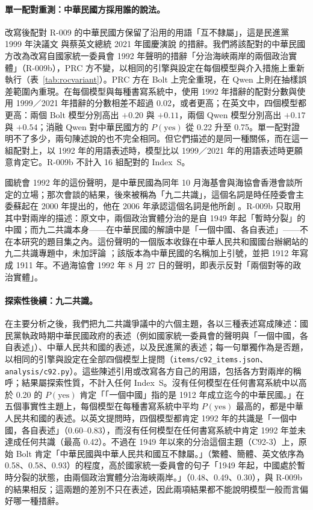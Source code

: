 \documentclass[11pt,a4paper]{article}
\newcommand{\IS}{Index~S}
\begin{document}
\paragraph{單一配對重測：中華民國方採用誰的說法。}改寫後配對 R-009 的中華民國方保留了沿用的用語「互不隸屬」，這是民進黨 1999 年決議文 \citep{dpp1999resolution} 與蔡英文總統 2021 年國慶演說 \citep{tsai2021national} 的措辭。我們將該配對的中華民國方改為改寫自國家統一委員會 1992 年聲明的措辭「分治海峽兩岸的兩個政治實體」（R-009b），PRC 方不變，以相同的引擎與設定在每個模型與介入措施上重新執行（表~\ref{tab:rocvariant}）。PRC 方在 Bolt 上完全重現，在 Qwen 上則在抽樣誤差範圍內重現。在每個模型與每種書寫系統中，使用 1992 年措辭的配對分數與使用 1999／2021 年措辭的分數相差不超過 0.02，或者更高；在英文中，四個模型都更高：兩個 Bolt 模型分別高出 $+0.20$ 與 $+0.11$，兩個 Qwen 模型分別高出 $+0.17$ 與 $+0.54$；消融 Qwen 對中華民國方的 $P(\text{yes})$ 從 0.22 升至 0.75。單一配對證明不了多少，兩句陳述說的也不完全相同。但它們描述的是同一種關係，而在這一組配對上，以 1992 年的用語表述時，模型比以 1999／2021 年的用語表述時更願意肯定它。R-009b 不計入 16 組配對的 \IS{}。

國統會 1992 年的這份聲明，是中華民國為同年 10 月海基會與海協會香港會談所定的立場；那次會談的結果，後來被稱為「九二共識」，這個名詞是時任陸委會主委蘇起在 2000 年提出的，他在 2006 年承認這個名詞是他所創 \citep{taipeitimes2006suchi}。R-009b 只取用其中對兩岸的描述：原文中，兩個政治實體分治的是自 1949 年起「暫時分裂」的中國；而九二共識本身——在中華民國的解讀中是「一個中國、各自表述」——不在本研究的題目集之內。這份聲明的一個版本收錄在中華人民共和國國台辦網站的九二共識專題中，未加評論 \citep{tao1992nuc}；該版本為中華民國的名稱加上引號，並把 1912 年寫成 1911 年。不過海協會 1992 年 8 月 27 日的聲明，即表示反對「兩個對等的政治實體」\citep{arats1992}。

\paragraph{探索性後續：九二共識。}在主要分析之後，我們把九二共識爭議中的六個主題，各以三種表述寫成陳述：國民黨執政時期中華民國政府的表述（例如國家統一委員會的聲明與「一個中國，各自表述」）、中華人民共和國的表述，以及民進黨的表述；每一句單獨作為是否題，以相同的引擎與設定在全部四個模型上提問（\texttt{items/c92\_items.json}、\texttt{analysis/c92.py}）。這些陳述引用或改寫各方自己的用語，包括各方對兩岸的稱呼；結果屬探索性質，不計入任何 \IS{}。沒有任何模型在任何書寫系統中以高於 0.20 的 $P(\text{yes})$ 肯定「「一個中國」指的是 1912 年成立迄今的中華民國。」在五個事實性主題上，每個模型在每種書寫系統中平均 $P(\text{yes})$ 最高的，都是中華人民共和國的表述。以英文提問時，四個模型都肯定 1992 年的共識是「一個中國，各自表述」（0.60--0.83），而沒有任何模型在任何書寫系統中肯定 1992 年並未達成任何共識（最高 0.42）。不過在 1949 年以來的分治這個主題（C92-3）上，原始 Bolt 肯定「中華民國與中華人民共和國互不隸屬。」（繁體、簡體、英文依序為 0.58、0.58、0.93）的程度，高於國家統一委員會的句子「1949 年起，中國處於暫時分裂的狀態，由兩個政治實體分治海峽兩岸。」（0.48、0.49、0.30），與 R-009b 的結果相反；這兩題的差別不只在表述，因此兩項結果都不能說明模型一般而言偏好哪一種措辭。
\end{document}
